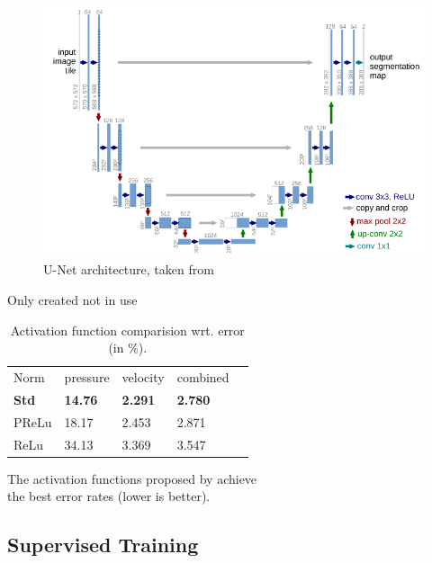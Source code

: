 \documentclass[acmtog]{techreportacmart}
\begin{document}
\begin{figure}[H]
  \includegraphics[width=.4\textwidth]{figures/U-Net_classic}
  \caption{U-Net architecture, taken from \cite{ronneberger2015}}
  \label{fig:two}
\end{figure}


Only created not in use
\begin{table}[h]
\caption{Activation function comparision wrt. error (in \%).}
\label{tab:two}
\begin{center}
\begin{tabular}{l|l|l|l|l}
  \toprule
  Norm   & pressure   &	velocity    & combined \\
  \bf Std	 & \bf 14.76	  & \bf 2.291		& \bf 2.780	   \\
  PReLu	 & 18.17	  & 2.453		& 2.871	   \\
  ReLu	 & 34.13	  & 3.369		& 3.547	   \\
  \bottomrule
\end{tabular}
\end{center}
\bigskip\centering
\footnotesize The activation functions proposed by \cite{Thuerey20} achieve \\ the best error rates (lower is better).
\end{table}%

\subsection{Supervised Training}
\end{document}
